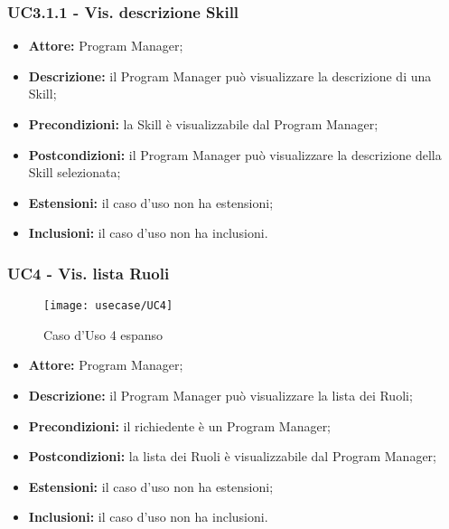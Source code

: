 \subsubsection*{UC3.1.1 - Vis. descrizione Skill}
\begin{itemize}[label=$\circ$]
\item \textbf{Attore:} Program Manager;
\item \textbf{Descrizione:} il Program Manager può visualizzare la descrizione di una Skill;
\item \textbf{Precondizioni:} la Skill è visualizzabile dal Program Manager;
\item \textbf{Postcondizioni:} il Program Manager può visualizzare la descrizione della Skill selezionata;
\item \textbf{Estensioni:} il caso d'uso non ha estensioni;
\item \textbf{Inclusioni:} il caso d'uso non ha inclusioni.
\end{itemize}

\subsubsection*{UC4 - Vis. lista Ruoli}
\begin{figure}[H] 
    \centering 
    \texttt{[image: usecase/UC4]} 
    \caption{Caso d'Uso 4 espanso}
\end{figure}
\begin{itemize}[label=$\circ$]
\item \textbf{Attore:} Program Manager;
\item \textbf{Descrizione:} il Program Manager può visualizzare la lista dei Ruoli;
\item \textbf{Precondizioni:} il richiedente è un Program Manager;
\item \textbf{Postcondizioni:} la lista dei Ruoli è visualizzabile dal Program Manager;
\item \textbf{Estensioni:} il caso d'uso non ha estensioni;
\item \textbf{Inclusioni:} il caso d'uso non ha inclusioni.
\end{itemize}


